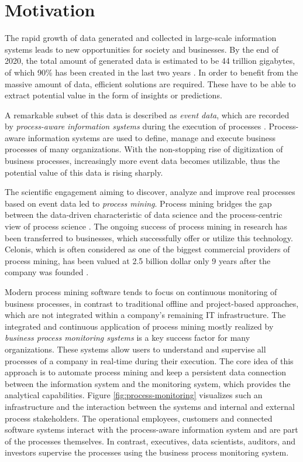 
\section{Motivation}

The rapid growth of data generated and collected in large-scale information systems leads to new opportunities for  society and businesses. 
By the end of 2020, the total amount of generated data is estimated to be 44 trillion gigabytes, of which 90\% has been created in the last two years \cite{datagrowth}.
In order to benefit from the massive amount of data, efficient solutions are required.
These have to be able to extract potential value in the form of insights or predictions.

A remarkable subset of this data is described as \textit{event data}, which are recorded by \textit{process-aware information systems} during the execution of processes \cite{DBLP:journals/topnoc/Aalst09}.
Process-aware information systems are used to define, manage and execute business processes of many organizations.
With the non-stopping rise of digitization of business processes, increasingly more event data becomes utilizable, thus the potential value of this data is rising sharply.

The scientific engagement aiming to discover, analyze and improve real processes based on event data led to \textit{process mining}. Process mining bridges the gap between the data-driven characteristic of data science and the process-centric view of process science  \cite{DBLP:books/sp/Aalst16}.
The ongoing success of process mining in research has been transferred to businesses, which successfully offer or utilize this technology.
Celonis, which is often considered as one of the biggest commercial providers of process mining, has been valued at 2.5 billion dollar only 9 years after the company was founded \cite{celonis}.

Modern process mining software tends to focus on continuous monitoring of business processes, in contrast to traditional offline and project-based approaches, which are not integrated within a company’s remaining IT infrastructure.
The integrated and continuous application of process mining mostly realized by \textit{business process monitoring systems} is a key success factor for many organizations.
These systems allow users to understand and supervise all processes of a company in real-time during their execution.
The core idea of this approach is to automate process mining and keep a persistent data connection between the information system and the monitoring system, which provides the analytical capabilities.
Figure \ref{fig:process-monitoring} visualizes such an infrastructure and the interaction between the systems and internal and external process stakeholders.
The operational employees, customers and connected software systems interact with the process-aware information system and are part of the processes themselves.
In contrast, executives, data scientists, auditors, and investors supervise the processes using the business process monitoring system.

